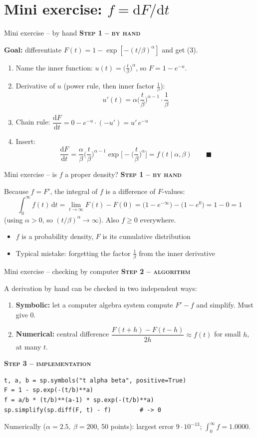 \documentclass[aspectratio=169,11pt]{beamer}
\newcommand{\stage}[2]{{\color{#1}\bfseries\small\textsc{#2}}\par\smallskip}
\newcommand{\Byhand}{\stage{hand}{Step 1 -- by hand}}
\newcommand{\Algo}{\stage{algo}{Step 2 -- algorithm}}
\newcommand{\Impl}{\stage{impl}{Step 3 -- implementation}}
\begin{document}
\section{Mini exercise: $f=\mathrm dF/\mathrm dt$}

\begin{frame}{Mini exercise -- by hand}
\Byhand
\textbf{Goal:} differentiate $F(t)=1-\exp[-(t/\beta)^\alpha]$ and get (3).
\begin{enumerate}
\item Name the inner function: $u(t)=\big(\tfrac t\beta\big)^{\alpha}$, so $F=1-e^{-u}$.
\item Derivative of $u$ (power rule, then inner factor $\tfrac1\beta$):
\[u'(t)=\alpha\Big(\frac t\beta\Big)^{\alpha-1}\cdot\frac1\beta\]
\item Chain rule: $\dfrac{\mathrm dF}{\mathrm dt}=0-e^{-u}\cdot(-u')=u'\,e^{-u}$
\item Insert:
\[\frac{\mathrm dF}{\mathrm dt}=\frac\alpha\beta\Big(\frac t\beta\Big)^{\alpha-1}\exp\!\Big[-\Big(\frac t\beta\Big)^{\alpha}\Big]=f(t\mid\alpha,\beta)\qquad\blacksquare\]
\end{enumerate}
\end{frame}

\begin{frame}{Mini exercise -- is $f$ a proper density?}
\Byhand
Because $f=F'$, the integral of $f$ is a difference of $F$-values:
\[
\int_0^\infty f(t)\,\mathrm dt=\lim_{t\to\infty}F(t)-F(0)
=\big(1-e^{-\infty}\big)-\big(1-e^{0}\big)=1-0=1
\]
(using $\alpha>0$, so $(t/\beta)^\alpha\to\infty$). Also $f\ge0$ everywhere.
\medskip
\begin{itemize}
\item[$\Rightarrow$] $f$ is a probability density, $F$ is its cumulative distribution
\item Typical mistake: forgetting the factor $\tfrac1\beta$ from the inner derivative
\end{itemize}
\end{frame}

\begin{frame}[fragile]{Mini exercise -- checking by computer}\small
\Algo
A derivation by hand can be checked in two independent ways:
\begin{enumerate}
\item \textbf{Symbolic:} let a computer algebra system compute $F'-f$ and simplify. Must give $0$.
\item \textbf{Numerical:} central difference $\dfrac{F(t+h)-F(t-h)}{2h}\approx f(t)$ for small $h$, at many $t$.
\end{enumerate}
\Impl
\begin{lstlisting}
t, a, b = sp.symbols("t alpha beta", positive=True)
F = 1 - sp.exp(-(t/b)**a)
f = a/b * (t/b)**(a-1) * sp.exp(-(t/b)**a)
sp.simplify(sp.diff(F, t) - f)        # -> 0
\end{lstlisting}
\small Numerically ($\alpha=2.5,\ \beta=200$, 50 points): largest error $9\cdot10^{-13}$; $\int_0^\infty f=1.0000$.
\end{frame}
\end{document}

